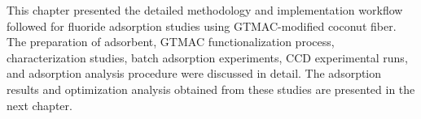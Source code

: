 This chapter presented the detailed methodology and implementation workflow followed for fluoride adsorption studies using GTMAC-modified coconut fiber. The preparation of adsorbent, GTMAC functionalization process, characterization studies, batch adsorption experiments, CCD experimental runs, and adsorption analysis procedure were discussed in detail. The adsorption results and optimization analysis obtained from these studies are presented in the next chapter. 
%
%

